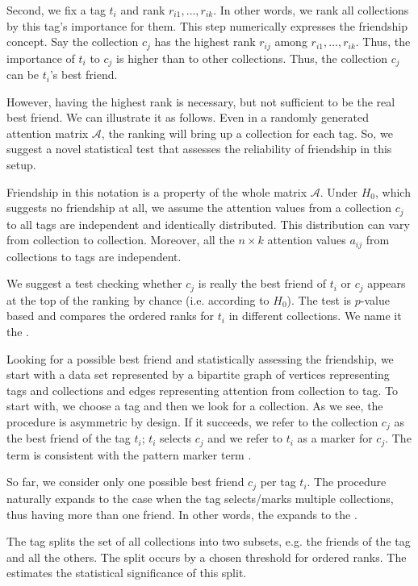 \documentclass{llncs}
\begin{document}
Second, we fix a tag $t_i$ and rank $r_{i1}, \dots, r_{ik}$. In other words, we rank all collections by this tag's importance for them.
This step numerically expresses the friendship concept. Say the collection $c_j$ has  the highest rank $r_{ij}$ among $r_{i1}, \dots, r_{ik}$. Thus, the importance of $t_i$ to $c_j$ is higher than to other collections. Thus, the collection $c_j$ can be $t_i$'s best friend.

However, having the highest rank is necessary, but not sufficient to be the real best friend. We can illustrate it as follows. Even in a randomly generated attention matrix $\mathcal{A}$, the ranking will bring up a collection for each tag. So, we suggest a novel statistical test that assesses the reliability of friendship in this setup.

Friendship in this notation is a property of the whole matrix $\mathcal{A}$.
Under $H_0$, which suggests no friendship at all, we assume the attention values from a collection $c_j$ to all tags are independent and identically distributed.
This distribution can vary from collection  to collection. Moreover, all the $n \times k$ attention values $a_{ij}$ from collections to tags are independent.

We suggest a test checking whether $c_j$ is really the best friend of $t_i$ or $c_j$ appears at the top of the ranking by chance (i.e. according to $H_0$). The test is $p$-value based and compares the ordered ranks for $t_i$ in different collections. We name it the .

Looking for a possible best friend and statistically assessing the friendship, we start with a data set represented by a bipartite graph of vertices representing tags and collections and edges representing attention from collection to tag.
To start with, we choose a tag and then we look for a collection. As we see, the procedure is asymmetric by design. If it succeeds, we refer to the collection $c_j$ as the best friend of the tag $t_i$; $t_i$ selects $c_j$ and we refer to $t_i$ as a marker for $c_j$. The term is consistent with the pattern marker term \cite{stein-obrien_patternmarkers_2017}.

So far, we consider only one possible best friend $c_j$ per tag $t_i$. The procedure naturally expands to the case when the tag selects/marks multiple collections, thus having more than one friend. In other words, the  expands to the .

The tag splits the set of all collections into two subsets, e.g. the friends of the tag and all the others. The split occurs by a chosen threshold for ordered ranks. The  estimates the statistical significance of this split.
\end{document}
